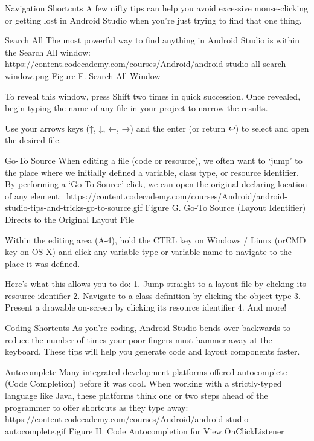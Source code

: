 Navigation Shortcuts
        A few nifty tips can help you avoid excessive mouse-clicking or getting lost in Android Studio when you’re just trying to find that one thing.

    Search All
        The most powerful way to find anything in Android Studio is within the Search All window:
            🎨https://content.codecademy.com/courses/Android/android-studio-all-search-window.png
                Figure F. Search All Window

        To reveal this window, press Shift two times in quick succession. Once revealed, begin typing the name of any file in your project to narrow the results.

        Use your arrows keys (↑, ↓, ←, →) and the enter (or return ↩) to select and open the desired file.

    Go-To Source
        When editing a file (code or resource), we often want to ‘jump’ to the place where we initially defined a variable, class type, or resource identifier. By performing a ‘Go-To Source’ click, we can open the original declaring location of any element:
            🎨https://content.codecademy.com/courses/Android/android-studio-tips-and-tricks-go-to-source.gif
                Figure G. Go-To Source (Layout Identifier) Directs to the Original Layout File

        Within the editing area (A-4), hold the CTRL key on Windows / Linux (orCMD key on OS X) and click any variable type or variable name to navigate to the place it was defined.

        Here’s what this allows you to do:
            1. Jump straight to a layout file by clicking its resource identifier
            2. Navigate to a class definition by clicking the object type
            3. Present a drawable on-screen by clicking its resource identifier
            4. And more!

Coding Shortcuts
        As you’re coding, Android Studio bends over backwards to reduce the number of times your poor fingers must hammer away at the keyboard. These tips will help you generate code and layout components faster.

    Autocomplete
        Many integrated development platforms offered autocomplete (Code Completion) before it was cool. When working with a strictly-typed language like Java, these platforms think one or two steps ahead of the programmer to offer shortcuts as they type away:
            🎨https://content.codecademy.com/courses/Android/android-studio-autocomplete.gif
                Figure H. Code Autocompletion for View.OnClickListener

